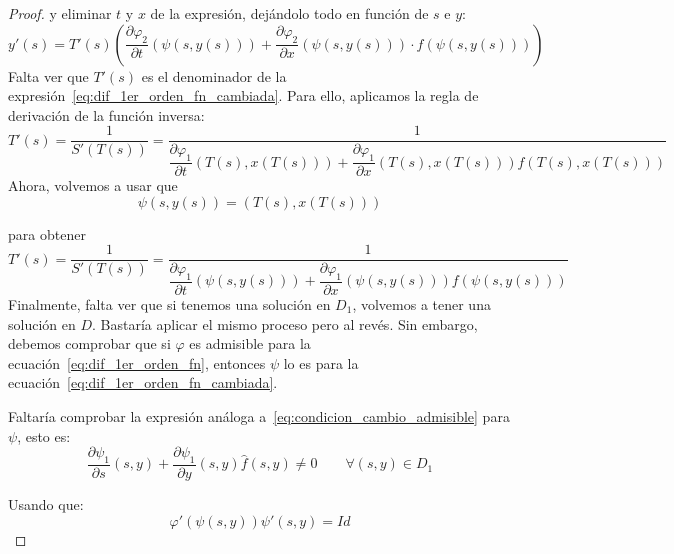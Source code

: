 \begin{teo}
\begin{proof}
    y eliminar $t$ y $x$ de la expresión, dejándolo todo en función de $s$ e $y$:
    \begin{equation*}
        y'(s) = T'(s) \left(\dfrac{\partial\varphi_2}{\partial t}(\psi(s,y(s)))+ \dfrac{\partial \varphi_2}{\partial x}(\psi(s,y(s)))\cdot f(\psi(s,y(s)))\right)
    \end{equation*}
    Falta ver que $T'(s)$ es el denominador de la expresión~\ref{eq:dif_1er_orden_fn_cambiada}. Para ello, aplicamos la regla de derivación de la función inversa:
    \begin{equation*}
        T'(s) = \dfrac{1}{S'(T(s))} =  \dfrac{1}{\dfrac{\partial\varphi_1}{\partial t}(T(s),x(T(s))) + \dfrac{\partial\varphi_1}{\partial x}(T(s),x(T(s)))f(T(s),x(T(s)))} 
    \end{equation*}
    Ahora, volvemos a usar que
    \begin{equation*}
        \psi(s,y(s)) = (T(s), x(T(s)))
    \end{equation*}

    para obtener
    \begin{equation*}
        T'(s) = \dfrac{1}{S'(T(s))} =  \dfrac{1}{\dfrac{\partial\varphi_1}{\partial t}(\psi(s,y(s))) + \dfrac{\partial\varphi_1}{\partial x}(\psi(s,y(s)))f(\psi(s,y(s)))} 
    \end{equation*}
    Finalmente, falta ver que si tenemos una solución en $D_1$, volvemos a tener una solución en $D$. Bastaría aplicar el mismo proceso pero al revés. Sin embargo, debemos comprobar que si $\varphi$ es admisible para la ecuación~\ref{eq:dif_1er_orden_fn}, entonces $\psi$ lo es para la ecuación~\ref{eq:dif_1er_orden_fn_cambiada}.

    Faltaría comprobar la expresión análoga a~\ref{eq:condicion_cambio_admisible} para $\psi$, esto es:
    \begin{equation*}
        \dfrac{\partial\psi_1}{\partial s}(s,y) + \dfrac{\partial\psi_1}{\partial y}(s,y)\hat{f}(s,y) \neq 0 \qquad \forall (s,y) \in  D_1
    \end{equation*}

    Usando que:
    \begin{equation*}
        \varphi'(\psi(s,y))\psi'(s,y) = Id
    \end{equation*}
\end{proof}
\end{teo}

